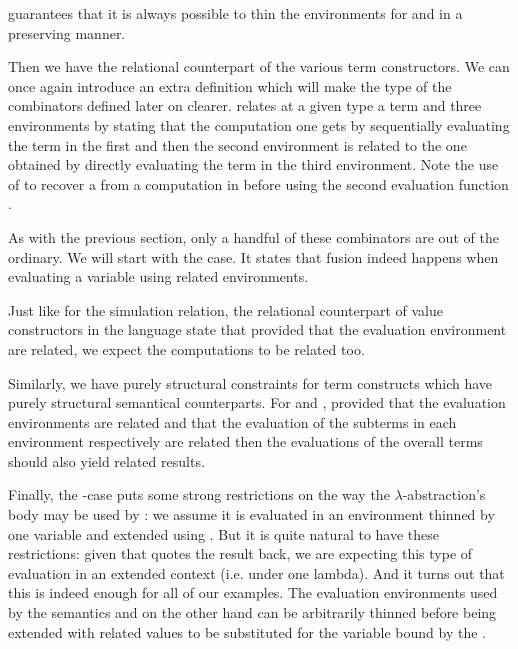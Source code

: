  guarantees that it is always possible to thin the environments
for  and  in a  preserving manner.


Then we have the relational counterpart of the various term constructors. We can once
again introduce an extra definition  which will make the type of the combinators
defined later on clearer.  relates at a given type a term and three environments
by stating that the computation one gets by sequentially evaluating the term in the first
and then the second environment is related to the one obtained by directly evaluating
the term in the third environment. Note the use of  to recover a 
from a computation in  before using the second evaluation function .


As with the previous section, only a handful of these combinators are out
of the ordinary. We will start with the  case. It states that
fusion indeed happens when evaluating a variable using related environments.


Just like for the simulation relation, the relational counterpart of value constructors
in the language state that provided that the evaluation environment are related,
we expect the computations to be related too.


Similarly, we have purely structural constraints for term constructs which have purely
structural semantical counterparts. For  and , provided that the
evaluation environments are related and that the evaluation of the subterms in each
environment respectively are related then the evaluations of the overall terms should
also yield related results.


Finally, the -case puts some strong restrictions on the way the
$λ$-abstraction's body may be used by : we assume it is evaluated in an
environment thinned by one variable and extended using . But it is
quite natural to have these restrictions: given that  quotes the
result back, we are expecting this type of evaluation in an extended context
(i.e. under one lambda). And it turns out that this is indeed enough for all of
our examples. The evaluation environments used by the semantics  and
 on the other hand can be arbitrarily thinned before being extended with
related values to be substituted for the variable bound by the .

